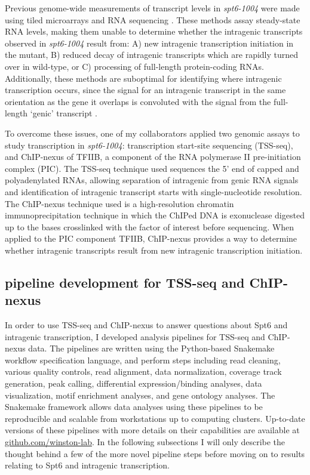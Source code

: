 \documentclass[10pt, letterpaper]{article}
\begin{document}
Previous genome-wide measurements of transcript levels in \textit{spt6-1004} were made using tiled microarrays \cite{cheung2008} and RNA sequencing \cite{uwimana2017}. These methods assay steady-state RNA levels, making them unable to determine whether the intragenic transcripts observed in \textit{spt6-1004} result from: A) new intragenic transcription initiation in the mutant, B) reduced decay of intragenic transcripts which are rapidly turned over in wild-type, or C) processing of full-length protein-coding RNAs. Additionally, these methods are suboptimal for identifying where intragenic transcription occurs, since the signal for an intragenic transcript in the same orientation as the gene it overlaps is convoluted with the signal from the full-length `genic' transcript \cite{cheung2008, lickwar2009}.

To overcome these issues, one of my collaborators applied two genomic assays to study transcription in \textit{spt6-1004}: transcription start-site sequencing (TSS-seq), and ChIP-nexus of TFIIB, a component of the RNA polymerase II pre-initiation complex (PIC). The TSS-seq technique used sequences the 5' end of capped and polyadenylated RNAs, allowing separation of intragenic from genic RNA signals and identification of intragenic transcript starts with single-nucleotide resolution. The ChIP-nexus technique used is a high-resolution chromatin immunoprecipitation technique in which the ChIPed DNA is exonuclease digested up to the bases crosslinked with the factor of interest before sequencing. When applied to the PIC component TFIIB, ChIP-nexus provides a way to determine whether intragenic transcripts result from new intragenic transcription initiation.

\subsection{pipeline development for TSS-seq and ChIP-nexus}

In order to use TSS-seq and ChIP-nexus to answer questions about Spt6 and intragenic transcription, I developed analysis pipelines for TSS-seq and ChIP-nexus data. The pipelines are written using the Python-based Snakemake workflow specification language, and perform steps including read cleaning, various quality controls, read alignment, data normalization, coverage track generation, peak calling, differential expression/binding analyses, data visualization, motif enrichment analyses, and gene ontology analyses. The Snakemake framework allows data analyses using these pipelines to be reproducible and scalable from workstations up to computing clusters. Up-to-date versions of these pipelines with more details on their capabilities are available at \href{https://github.com/winston-lab}{github.com/winston-lab}. In the following subsections I will only describe the thought behind a few of the more novel pipeline steps before moving on to results relating to Spt6 and intragenic transcription.
\end{document}
